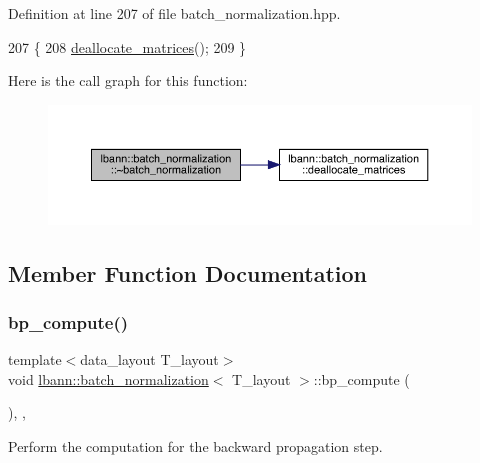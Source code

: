 Definition at line 207 of file batch\+\_\+normalization.\+hpp.


\begin{DoxyCode}
207                                           \{
208     \hyperlink{classlbann_1_1batch__normalization_ac98f8fbb6e5ea998a06cef2c2cac9f03}{deallocate\_matrices}();
209   \}
\end{DoxyCode}
Here is the call graph for this function\+:\nopagebreak
\begin{figure}[H]
\begin{center}
\leavevmode
\includegraphics[width=350pt]{classlbann_1_1batch__normalization_a6aeb06e13733560fb2203ea08df42632_cgraph}
\end{center}
\end{figure}


\subsection{Member Function Documentation}
\mbox{\label{classlbann_1_1batch__normalization_ad9aedd689cd8923d8c8e9c4e57a4e8b7}} 
\subsubsection{\texorpdfstring{bp\+\_\+compute()}{bp\_compute()}}
{\footnotesize\ttfamily template$<$data\+\_\+layout T\+\_\+layout$>$ \\
void \hyperlink{classlbann_1_1batch__normalization}{lbann\+::batch\+\_\+normalization}$<$ T\+\_\+layout $>$\+::bp\+\_\+compute (\begin{DoxyParamCaption}{ }\end{DoxyParamCaption})\hspace{0.3cm}{\ttfamily [inline]}, {\ttfamily [override]}, {\ttfamily [virtual]}}

Perform the computation for the backward propagation step. 

